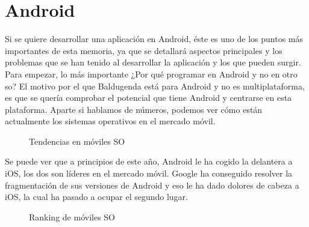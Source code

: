 \section{Android}
\label{secc:android}
Si se quiere desarrollar una aplicación en Android, éste es uno de los puntos más importantes de esta memoria, ya que se detallará aspectos principales y los problemas que se han tenido al desarrollar la aplicación y los que pueden surgir.
Para empezar, lo más importante ¿Por qué programar en Android y no en otro \acrshort{so}?
El motivo por el que Baldugenda está para Android  y no es multiplataforma, es que se quería 
comprobar el potencial que tiene Android y centrarse en esta plataforma.
Aparte si hablamos de números, podemos ver cómo están actualmente los sistemas operativos en el mercado móvil\cite{Tendencias}.

\begin{figure}[H] 
  \begin{center} 
    \caption{Tendencias en móviles SO} 
    \label{fig:TendenciasSO} 
  \end{center} 
\end{figure}

Se puede ver que a principios de este año, Android le ha cogido la delantera a iOS, los dos son líderes en el mercado móvil.
Google ha conseguido resolver la fragmentación de sus versiones de Android y eso le ha dado dolores de cabeza a iOS, la cual ha pasado a ocupar el segundo lugar.
\newpage
\begin{figure}[H] 
  \begin{center} 
    \caption{Ranking de móviles SO} 
    \label{fig:RankingSO} 
  \end{center} 
\end{figure}


